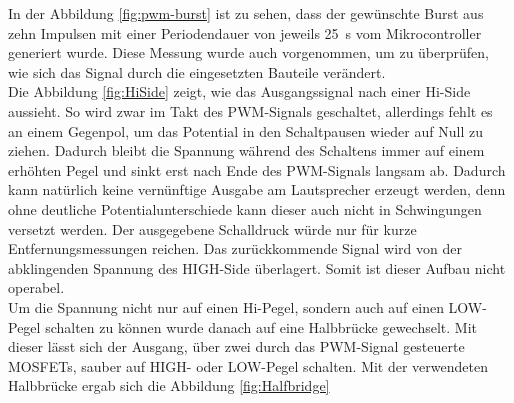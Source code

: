 In der Abbildung \ref{fig:pwm-burst} ist zu sehen, dass der gewünschte Burst aus zehn Impulsen mit einer Periodendauer von jeweils 25~\textmu s vom Mikrocontroller generiert wurde. Diese Messung wurde auch vorgenommen, um zu überprüfen, wie sich das Signal durch die eingesetzten Bauteile verändert.\\
Die Abbildung \ref{fig:HiSide} zeigt, wie das Ausgangssignal nach einer Hi-Side aussieht. So wird zwar im Takt des PWM-Signals geschaltet, allerdings fehlt es an einem Gegenpol, um das Potential in den Schaltpausen wieder auf Null zu ziehen. Dadurch bleibt die Spannung während des Schaltens immer auf einem erhöhten Pegel und sinkt erst nach Ende des PWM-Signals langsam ab. Dadurch kann natürlich keine vernünftige Ausgabe am Lautsprecher erzeugt werden, denn ohne deutliche Potentialunterschiede kann dieser auch nicht in Schwingungen versetzt werden. Der ausgegebene Schalldruck würde nur für kurze Entfernungsmessungen reichen. Das zurückkommende Signal wird von der abklingenden Spannung des HIGH-Side überlagert. Somit ist dieser Aufbau nicht operabel.\\
Um die Spannung nicht nur auf einen Hi-Pegel, sondern auch auf einen LOW-Pegel schalten zu können wurde danach auf eine Halbbrücke gewechselt. Mit dieser lässt sich der Ausgang, über zwei durch das PWM-Signal gesteuerte MOSFETs, sauber auf HIGH- oder LOW-Pegel schalten. %
Mit der verwendeten Halbbrücke ergab sich die Abbildung \ref{fig:Halfbridge}\\
